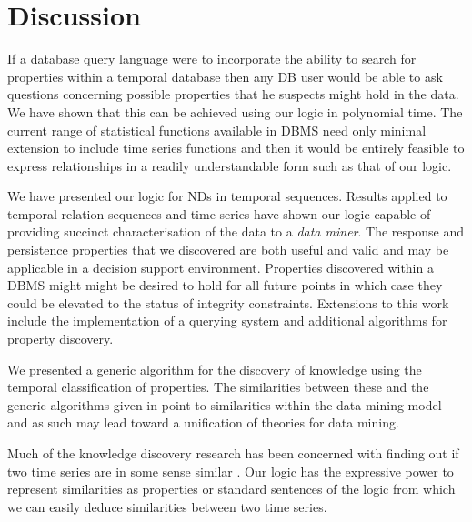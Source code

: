 \section{Discussion}\label{sec:tr_disc}



If a database query language were to incorporate the ability to search
for properties within a temporal database then any DB user would be
able to ask questions concerning possible properties that he suspects
might hold in the data. We have shown that this can be achieved using
our logic in polynomial time. The current range of statistical
functions available in DBMS need only minimal extension to include time
series functions and then it would be entirely feasible to express
relationships in a readily understandable form such as that of our
logic.
 
\medskip
 
We have presented our logic for NDs in temporal sequences. Results
applied to temporal relation sequences and time series have shown our
logic capable of providing succinct characterisation of the data to a
{\em data miner}. The response and persistence properties that we discovered are both useful and
valid and may be applicable in a decision support
environment. Properties discovered within a DBMS might might be
desired to hold for all future points in which case they could be
elevated to the status of integrity constraints. 
Extensions to this work include the implementation of a
querying system and additional algorithms for property discovery.

\medskip
We presented a generic algorithm for the discovery of knowledge using
the temporal classification of properties. The similarities between
these and the generic algorithms given in \cite{man96,man97} point to
similarities within the data mining model and as such may lead toward
a unification of theories for data mining. 
\medskip 

Much of the knowledge discovery research has been concerned with
finding out if two time series are in some sense similar
\cite{frm94,alss95}. Our logic has the expressive power to represent
similarities as properties or standard sentences of the logic from
which we can easily deduce similarities between two time series.
